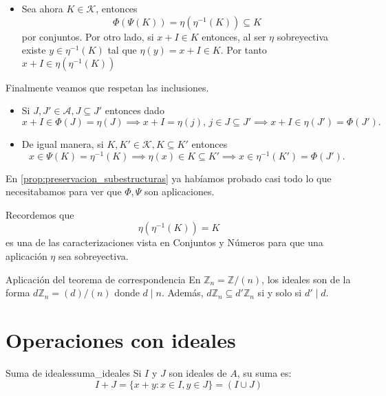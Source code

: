 \begin{proofbox}
\begin{itemize}
        \item Sea ahora $K \in \mathcal{K}$, entonces 
        \[
        \Phi(\Psi(K)) = \eta(\eta^{-1}(K)) \subseteq K
        \]
        por conjuntos. Por otro lado, si $x + I \in K$ entonces, al ser $\eta$ sobreyectiva existe $y \in \eta^{-1}(K)$ tal que $\eta(y) = x + I \in K$. Por tanto $x + I \in \eta(\eta^{-1}(K))$ 
    \end{itemize}

    Finalmente veamos que respetan las inclusiones.
    \begin{itemize}
        \item Si $J,J' \in \mathcal{A}, J \subseteq J'$ entonces dado
        \[
        x+I \in \Phi(J) = \eta(J) \implies x+I = \eta(j),\, j \in J \subseteq J' \implies x+I \in \eta(J') = \Phi(J').
        \]
        \item De igual manera, si $K, K' \in \mathcal{K}, K \subseteq K'$ entonces
        \[
        x \in \Psi(K) = \eta^{-1}(K) \implies \eta(x) \in K \subseteq K' \implies x \in \eta^{-1}(K') = \Phi(J').
        \]
    \end{itemize}
\end{proofbox}

\begin{remark}
    En \ref{prop:preservacion_subestructuras} ya habíamos probado casi todo lo que necesitabamos para ver que $\Phi, \Psi$ son aplicaciones.
\end{remark}

\begin{remark}
    Recordemos que
    \[
    \eta(\eta^{-1}(K)) = K
    \]
    es una de las caracterizaciones vista en Conjuntos y Números para que una aplicación $\eta$ sea sobreyectiva.
\end{remark}

\begin{example}{Aplicación del teorema de correspondencia}{}
    En \(\mathbb{Z}_n = \mathbb{Z}/(n)\), los ideales son de la forma \(d\mathbb{Z}_n = (d)/(n)\) donde \(d \mid n\). Además, \(d\mathbb{Z}_n \subseteq d'\mathbb{Z}_n\) si y solo si \(d' \mid d\).
\end{example}

\clearpage

\section{Operaciones con ideales}

\begin{definition}{Suma de ideales}{suma_ideales}
    Si \(I\) y \(J\) son ideales de \(A\), su {suma} es:
    \[
    I + J = \{x + y : x \in I, y \in J\} = (I \cup J)
    \]
\end{definition}

